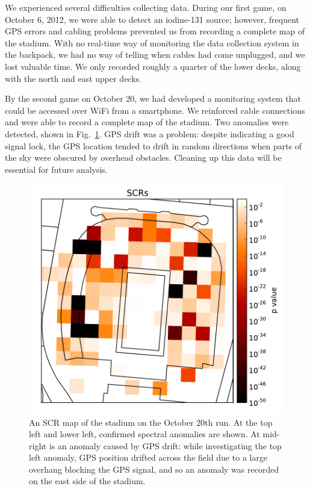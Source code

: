 We experienced several difficulties collecting data. During our first game, on
October 6, 2012, we were able to detect an iodine-131 source; however, frequent
GPS errors and cabling problems prevented us from recording a complete map of
the stadium. With no real-time way of monitoring the data collection system in
the backpack, we had no way of telling when cables had come unplugged, and we
lost valuable time. We only recorded roughly a quarter of the lower decks, along
with the north and east upper decks.

By the second game on October 20, we had developed a monitoring system that
could be accessed over WiFi from a smartphone. We reinforced cable connections
and were able to record a complete map of the stadium. Two anomalies were
detected, shown in Fig.~\ref{oct20-stadium-scr}. GPS drift was a problem:
despite indicating a good signal lock, the GPS location tended to drift in
random directions when parts of the sky were obscured by overhead
obstacles. Cleaning up this data will be essential for future analysis.

\begin{figure}
  \centering
  \includegraphics[width=\textwidth]{figures/oct20-stadium-scr.pdf}
  \caption{An SCR map of the stadium on the October 20th run. At the top left
    and lower left, confirmed spectral anomalies are shown. At mid-right is an
    anomaly caused by GPS drift: while investigating the top left anomaly, GPS
    position drifted across the field due to a large overhang blocking the GPS
    signal, and so an anomaly was recorded on the east side of the stadium.}
  \label{oct20-stadium-scr}
\end{figure}

